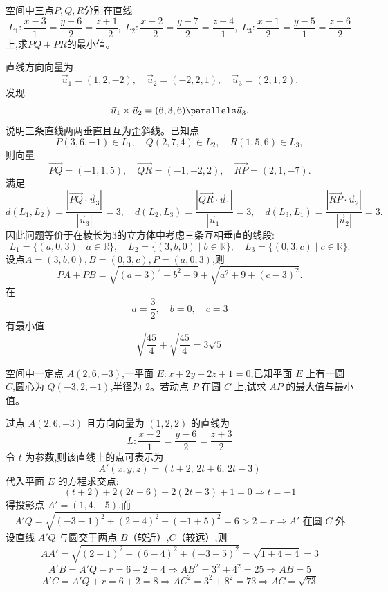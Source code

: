 \begin{questions}
    \question 空间中三点$P,Q,R$分别在直线
    \[
    L_1: \frac{x-3}{1} = \frac{y-6}{2} = \frac{z+1}{-2}, \;
    L_2: \frac{x-2}{-2} = \frac{y-7}{2} = \frac{z-4}{1}, \;
    L_3: \frac{x-1}{2} = \frac{y-5}{1} = \frac{z-6}{2}
    \]
    上,求$PQ+PR$的最小值。
    \begin{solution}
        直线方向向量为
        \[
        \vec{u}_1 = (1,2,-2), \quad \vec{u}_2 = (-2,2,1), \quad \vec{u}_3 = (2,1,2).
        \]
        发现
        \[
        \vec{u}_1 \times \vec{u}_2 = (6,3,6) \parallels \vec{u}_3,
        \]
        说明三条直线两两垂直且互为歪斜线。已知点
        \[
        P(3,6,-1) \in L_1, \quad Q(2,7,4) \in L_2, \quad R(1,5,6) \in L_3,
        \]
        则向量
        \[
        \overrightarrow{PQ} = (-1,1,5), \quad \overrightarrow{QR} = (-1,-2,2), \quad \overrightarrow{RP} = (2,1,-7).
        \]
        满足
        \[
        d(L_1,L_2) = \frac{|\overrightarrow{PQ} \cdot \vec{u}_3|}{|\vec{u}_3|} = 3, \quad
        d(L_2,L_3) = \frac{|\overrightarrow{QR} \cdot \vec{u}_1|}{|\vec{u}_1|} = 3, \quad
        d(L_3,L_1) = \frac{|\overrightarrow{RP} \cdot \vec{u}_2|}{|\vec{u}_2|} = 3.
        \]
        因此问题等价于在棱长为3的立方体中考虑三条互相垂直的线段:
        \[
        L_1 = \{(a,0,3) \mid a \in \mathbb{R}\}, \quad
        L_2 = \{(3,b,0) \mid b \in \mathbb{R}\}, \quad
        L_3 = \{(0,3,c) \mid c \in \mathbb{R}\}.
        \]
        设点$A =(3,b,0),B =(0,3,c),P =(a,0,3)$,则
        \[
        PA+PB = \sqrt{(a-3)^2 + b^2 + 9} + \sqrt{a^2 + 9 + (c-3)^2}.
        \]
        在
        \[
        a = \frac{3}{2}, \quad b=0, \quad c=3
        \]
        有最小值
        \[
        \sqrt{\frac{45}{4}} + \sqrt{\frac{45}{4}} = 3\sqrt{5}
        \]
    \end{solution}

    \question 空间中一定点 $A(2,6,-3)$,一平面 $E: x+2y+2z+1=0$,已知平面 $E$ 上有一圆 $C$,圆心为 $Q(-3,2,-1)$,半径为 $2$。若动点 $P$ 在圆 $C$ 上,试求 $AP$ 的最大值与最小值。
    \begin{solution}
        过点 $A(2,6,-3)$ 且方向向量为 $(1,2,2)$ 的直线为
        \[
        L: \frac{x-2}{1} = \frac{y-6}{2} = \frac{z+3}{2}
        \]
        令 $t$ 为参数,则该直线上的点可表示为
        \[
        A'(x,y,z) = (t+2,\,2t+6,\,2t-3)
        \]
        代入平面 $E$ 的方程求交点:
        \[
        (t+2) + 2(2t+6) + 2(2t-3) + 1 = 0\Rightarrow t = -1
        \]
        得投影点 $A' = (1,4,-5)$,而
        \[
        A'Q = \sqrt{(-3-1)^2 + (2-4)^2 + (-1+5)^2}  = 6 > 2 = r
        \Rightarrow A' \text{ 在圆 } C \text{ 外}
        \]
        设直线 $A'Q$ 与圆交于两点 $B$（较近）,$C$（较远）,则
        \[
        AA' = \sqrt{(2-1)^2 + (6-4)^2 + (-3+5)^2} = \sqrt{1 + 4 + 4} = 3 
        \]
        \[
        A'B = A'Q - r = 6 - 2 = 4 \Rightarrow AB^2 = 3^2 + 4^2 = 25 \Rightarrow AB = 5 
        \]
        \[
        A'C = A'Q + r = 6 + 2 = 8 \Rightarrow AC^2 = 3^2 + 8^2 = 73 \Rightarrow AC = \sqrt{73}
        \]
    \end{solution}


\end{questions}
